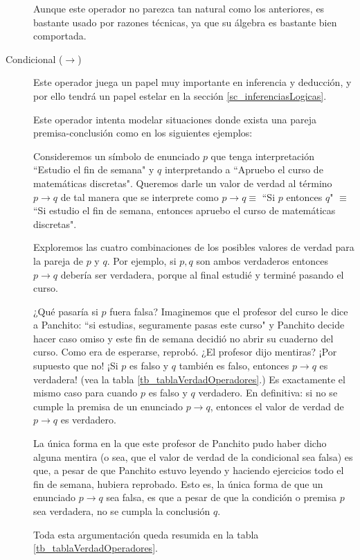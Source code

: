 \documentclass{book}
\theoremstyle{definition}
\begin{document}
\begin{description}
	Aunque este operador no parezca tan natural como los anteriores, es bastante usado por razones técnicas, ya que su álgebra es bastante bien comportada. %
	
	\item[Condicional ($\rightarrow$)] Este operador juega un papel muy importante en inferencia y deducción, y por ello tendrá un papel estelar en la sección \ref{sc_inferenciasLogicas}.
	
	Este operador intenta modelar situaciones donde exista una pareja premisa-conclusión como en los siguientes ejemplos:
	
	Consideremos un símbolo de enunciado $p$ que tenga interpretación ``Estudio el fin de semana" y $q$ interpretando a ``Apruebo el curso de matemáticas discretas".
	Queremos darle un valor de verdad al término $p \rightarrow q$ de tal manera que se interprete como $p\rightarrow q \equiv$ ``Si $p$ entonces $q$" $\equiv$ ``Si estudio el fin de semana, entonces apruebo el curso de matemáticas discretas".
	
	Exploremos las cuatro combinaciones de los posibles valores de verdad para la pareja de $p$ y $q$.
	Por ejemplo, si $p,q$ son ambos verdaderos entonces $p\rightarrow q$ debería ser verdadera, porque al final estudié y terminé pasando el curso.
	
	¿Qué pasaría si $p$ fuera falsa?
	Imaginemos que el profesor del curso le dice a Panchito: ``si estudias, seguramente pasas este curso" y Panchito decide hacer caso omiso y este fin de semana decidió no abrir su cuaderno del curso. Como era de esperarse, reprobó.
	¿El profesor dijo mentiras? 
	¡Por supuesto que no! 
	¡Si $p$ es falso y $q$ también es falso, entonces $p\rightarrow q$ es verdadera! (vea la tabla \ref{tb_tablaVerdadOperadores}.)
	Es exactamente el mismo caso para cuando $p$ es falso y $q$ verdadero.
	En definitiva: si no se cumple la premisa de un enunciado $p\rightarrow q$, entonces el valor de verdad de $p\rightarrow q$ es verdadero.
	
	La única forma en la que este profesor de Panchito pudo haber dicho alguna mentira (o sea, que el valor de verdad de la condicional sea falsa) es que, a pesar de que Panchito estuvo leyendo y haciendo ejercicios todo el fin de semana, hubiera reprobado.
	Esto es, la única forma de que un enunciado $p\rightarrow q$ sea falsa, es que a pesar de que la condición o premisa $p$ sea verdadera, no se cumpla la conclusión $q$.
	
	Toda esta argumentación queda resumida en la tabla \ref{tb_tablaVerdadOperadores}.
	

\end{description}
\end{document}
